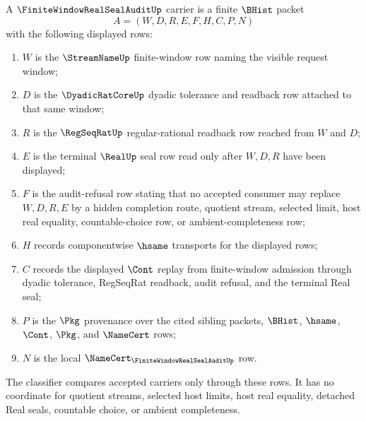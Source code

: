 \begin{definition}
\label{def:finite-window-real-seal-audit-carrier}
A $\FiniteWindowRealSealAuditUp$ carrier is a finite $\BHist$ packet
$$
A=(W,D,R,E,F,H,C,P,N)
$$
with the following displayed rows:
\begin{enumerate}
\item $W$ is the $\StreamNameUp$ finite-window row naming the visible request window;
\item $D$ is the $\DyadicRatCoreUp$ dyadic tolerance and readback row attached to that same window;
\item $R$ is the $\RegSeqRatUp$ regular-rational readback row reached from $W$ and $D$;
\item $E$ is the terminal $\RealUp$ seal row read only after $W,D,R$ have been displayed;
\item $F$ is the audit-refusal row stating that no accepted consumer may replace $W,D,R,E$ by a hidden completion route, quotient stream, selected limit, host real equality, countable-choice row, or ambient-completeness row;
\item $H$ records componentwise $\hsame$ transports for the displayed rows;
\item $C$ records the displayed $\Cont$ replay from finite-window admission through dyadic tolerance, RegSeqRat readback, audit refusal, and the terminal Real seal;
\item $P$ is the $\Pkg$ provenance over the cited sibling packets, $\BHist$, $\hsame$, $\Cont$, $\Pkg$, and $\NameCert$ rows;
\item $N$ is the local $\NameCert_{\FiniteWindowRealSealAuditUp}$ row.
\end{enumerate}
The classifier compares accepted carriers only through these rows. It has no coordinate for quotient streams, selected host limits, host real equality, detached Real seals, countable choice, or ambient completeness.
\end{definition}

